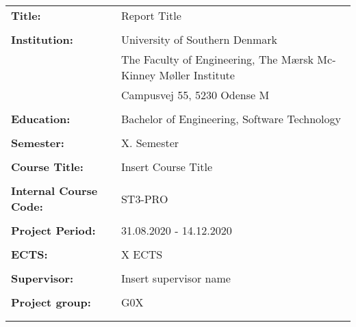 \begin{tabular}{@{}l l} 
\textbf{Title:} & Report Title \\
& \\
\textbf{Institution:} & University of Southern Denmark \\
& The Faculty of Engineering, The Mærsk Mc-Kinney Møller Institute \\
& Campusvej 55, 5230 Odense M \\
& \\
\textbf{Education:} & Bachelor of Engineering, Software Technology\\
& \\
\textbf{Semester:} & X. Semester \\
& \\
\textbf{Course Title:} & Insert Course Title \\
& \\
\textbf{Internal Course Code:} & ST3-PRO \\
& \\
\textbf{Project Period:} &  31.08.2020 - 14.12.2020 \\
& \\
\textbf{ECTS:} & X ECTS \\
& \\
\textbf{Supervisor:} & Insert supervisor name \\
& \\
\textbf{Project group:} & G0X\\
& \\

\\
\end{tabular}
